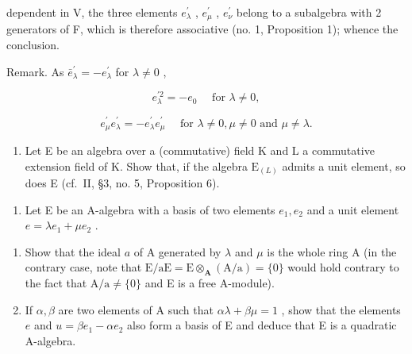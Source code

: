 dependent in V, the three elements \(e_{\lambda}^{\prime}\) , \(e_{\mu}^{\prime}\) , \(e_{\nu}^{\prime}\) belong to a subalgebra with 2 generators of F, which is therefore associative (no. 1, Proposition 1); whence the conclusion.

Remark. As \(\bar{e}_{\lambda}^{\prime} = -e_{\lambda}^{\prime}\) for \(\lambda \neq 0\) ,

\[
e _ {\lambda} ^ {\prime 2} = - e _ {0} \quad \text { for } \lambda \neq 0,
\]

\[
e _ {\mu} ^ {\prime} e _ {\lambda} ^ {\prime} = - e _ {\lambda} ^ {\prime} e _ {\mu} ^ {\prime} \quad \text { for } \lambda \neq 0, \mu \neq 0 \text { and } \mu \neq \lambda .
\]

\BourbakiExercisesHeading

\BourbakiExercisesSection

\begin{enumerate}
\def\labelenumi{\arabic{enumi}.}
\tightlist
\item
  Let E be an algebra over a (commutative) field K and L a commutative extension field of K. Show that, if the algebra \(\mathrm{E}_{(L)}\) admits a unit element, so does E (cf.~II, §3, no. 5, Proposition 6).
\end{enumerate}

\BourbakiExercisesSection

\begin{enumerate}
\def\labelenumi{\arabic{enumi}.}
\tightlist
\item
  Let E be an A-algebra with a basis of two elements \(e_1, e_2\) and a unit element \(e = \lambda e_1 + \mu e_2\) .
\end{enumerate}

\begin{enumerate}
\def\labelenumi{(\alph{enumi})}
\item
  Show that the ideal \(a\) of A generated by \(\lambda\) and \(\mu\) is the whole ring A (in the contrary case, note that \(\mathrm{E} / \mathrm{aE} = \mathrm{E} \otimes_{\mathbf{A}} (\mathrm{A} / \mathrm{a}) = \{0\}\) would hold contrary to the fact that \(\mathrm{A} / \mathrm{a} \neq \{0\}\) and E is a free A-module).
\item
  If \(\alpha, \beta\) are two elements of A such that \(\alpha\lambda + \beta\mu = 1\) , show that the elements \(e\) and \(u = \beta e_1 - \alpha e_2\) also form a basis of E and deduce that E is a quadratic A-algebra.
\end{enumerate}

